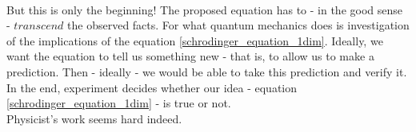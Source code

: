 \documentclass[12pt]{article}
\begin{document}
\\ \indent But this is only the beginning! The proposed equation has to - in the good sense - $transcend$ the observed facts. For what quantum mechanics does is investigation of the implications of the equation \eqref{schrodinger_equation_1dim}. Ideally, we want the equation to tell us something new - that is, to allow us to make a prediction. Then - ideally - we would be able to take this prediction and verify it. In the end, experiment decides whether our idea - equation \eqref{schrodinger_equation_1dim} - is true or not.
\\ \indent Physicist's work seems hard indeed.



\end{document}
